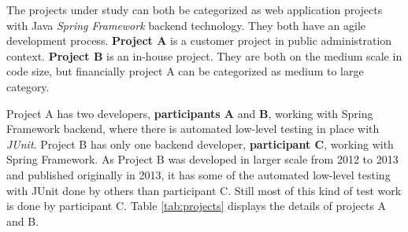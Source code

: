 The projects under study can both be categorized as web application projects with Java \textit{Spring Framework} backend technology.
They both have an agile development process. \textbf{Project A} is a customer project in public administration context.
\textbf{Project B} is an in-house project. They are both on the medium scale in code size, but financially project A can be
categorized as medium to large category.

Project A has two developers, \textbf{participants A} and \textbf{B}, working with Spring Framework backend,
where there is automated low-level testing in place with \textit{JUnit}.
Project B has only one backend developer, \textbf{participant C}, working with Spring Framework. As Project B
was developed in larger scale from 2012 to 2013 and published originally in 2013, it has some of the automated
low-level testing with JUnit done by others than participant C. Still most of this kind of test work is done by participant C.
Table \ref{tab:projects} displays the details of projects A and B.
